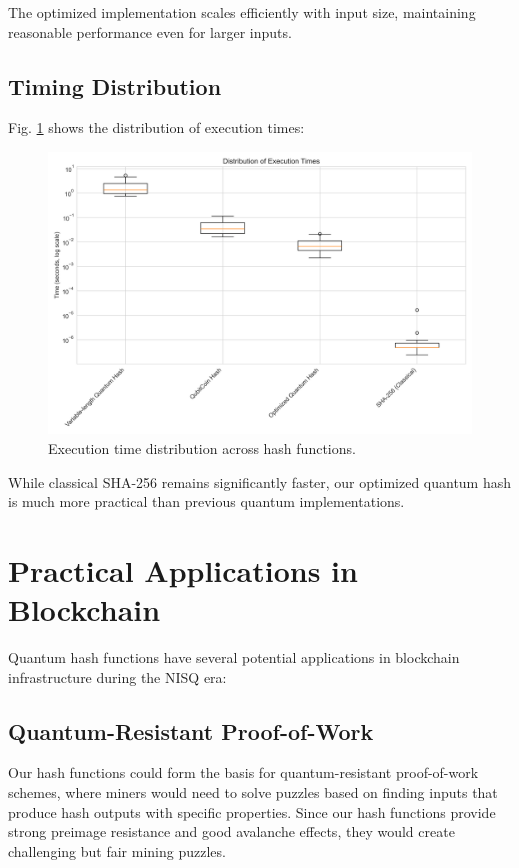 \documentclass[conference]{IEEEtran}
\begin{document}
The optimized implementation scales efficiently with input size, maintaining reasonable performance even for larger inputs.

\subsection{Timing Distribution}
Fig. \ref{fig:timing_distribution} shows the distribution of execution times:

\begin{figure}[!ht]
\centering
\includegraphics[width=\columnwidth]{visualizations/timing_distribution.png}
\caption{Execution time distribution across hash functions.}
\label{fig:timing_distribution}
\end{figure}

While classical SHA-256 remains significantly faster, our optimized quantum hash is much more practical than previous quantum implementations.

\section{Practical Applications in Blockchain}
Quantum hash functions have several potential applications in blockchain infrastructure during the NISQ era:

\subsection{Quantum-Resistant Proof-of-Work}
Our hash functions could form the basis for quantum-resistant proof-of-work schemes, where miners would need to solve puzzles based on finding inputs that produce hash outputs with specific properties. Since our hash functions provide strong preimage resistance and good avalanche effects, they would create challenging but fair mining puzzles.
\end{document}
